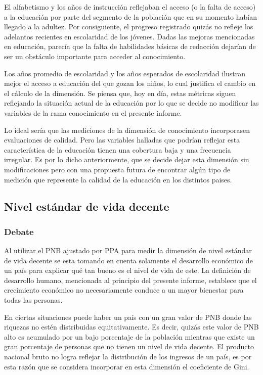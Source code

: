 \documentclass[
  10pt,
]{article}
\begin{document}
El alfabetismo y los años de instrucción reflejaban el acceso (o la
falta de acceso) a la educación por parte del segmento de la población
que en su momento habían llegado a la adultez. Por consiguiente, el
progreso registrado quizás no refleje los adelantos recientes en
escolaridad de los jóvenes. Dadas las mejoras mencionadas en educación,
parecía que la falta de habilidades básicas de redacción dejarían de ser
un obstáculo importante para acceder al conocimiento.

Los años promedio de escolaridad y los años esperados de escolaridad
ilustran mejor el acceso a educación del que gozan los niños, lo cual
justifica el cambio en el cálculo de la dimensión. Se piensa que, hoy en
día, estas métricas siguen reflejando la situación actual de la
educación por lo que se decide no modificar las variables de la rama
conocimiento en el presente informe.

Lo ideal sería que las mediciones de la dimensión de conocimiento
incorporasen evaluaciones de calidad. Pero las variables halladas que
podrían reflejar esta característica de la educación tienen una
cobertura baja y una frecuencia irregular. Es por lo dicho
anteriormente, que se decide dejar esta dimensión sin modificaciones
pero con una propuesta futura de encontrar algún tipo de medición que
represente la calidad de la educación en los distintos paises.

\subsection{Nivel estándar de vida
decente}\label{nivel-estuxe1ndar-de-vida-decente-1}

\subsubsection{Debate}\label{debate-1}

Al utilizar el PNB ajustado por PPA para medir la dimensión de nivel
estándar de vida decente se esta tomando en cuenta solamente el
desarrollo económico de un país para explicar qué tan bueno es el nivel
de vida de este. La definición de desarrollo humano, mencionada al
principio del presente informe, establece que el crecimiento económico
no necesariamente conduce a un mayor bienestar para todas las personas.

En ciertas situaciones puede haber un país con un gran valor de PNB
donde las riquezas no estén distribuidas equitativamente. Es decir,
quizás este valor de PNB alto es acumulado por un bajo porcentaje de la
población mientras que existe un gran porcentaje de personas que no
tienen un nivel de vida decente. El producto nacional bruto no logra
reflejar la distribución de los ingresos de un país, es por esta razón
que se considera incorporar en esta dimensión el coeficiente de Gini.
\end{document}
